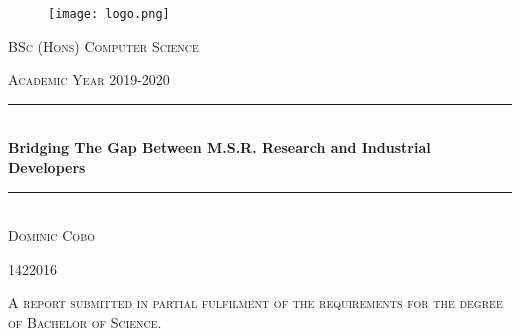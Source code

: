 \documentclass[a4paper, 10pt]{report}
\newcommand{\fypCourse}{BSc (Hons) Computer Science}
\newcommand{\fypStudent}{Dominic Cobo}
\newcommand{\fypStudentId}{1422016}
\newcommand{\fypAcademicYear}{2019-2020}
\newcommand{\fypTitle}{Bridging The Gap Between M.S.R. Research and Industrial Developers}
\begin{document}
	\begin{titlepage}
		\centering
		\begin{figure}
			\texttt{[image: logo.png]}
		\end{figure}
		\textsc{\LARGE \fypCourse}
		
		\textsc{\large Academic Year \fypAcademicYear}
		
		\rule{\linewidth}{0.5mm} \\[0.5cm]
		{ \huge\textbf { \fypTitle } } \\
		\rule{\linewidth}{0.5mm} \\[6cm]
		
		
		\textsc{\huge \fypStudent}
		
		\textsc{\large \fypStudentId}
		
		\bigskip
		
		\textsc{\large A report submitted in partial fulfilment of the requirements for the degree of Bachelor of Science.}
		
	\end{titlepage}
	
	\newpage
	
	
	
	
	
	
	
	
	
	\printbibliography
	
\end{document}
